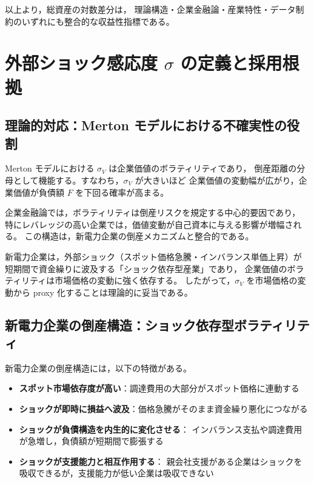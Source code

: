 以上より，総資産の対数差分は，
理論構造・企業金融論・産業特性・データ制約のいずれにも整合的な収益性指標である。


\section{外部ショック感応度 $\sigma$ の定義と採用根拠}

\subsection{理論的対応：Merton モデルにおける不確実性の役割}

Merton モデルにおける $\sigma_V$ は企業価値のボラティリティであり，
倒産距離の分母として機能する。すなわち，$\sigma_V$ が大きいほど
企業価値の変動幅が広がり，企業価値が負債額 $F$ を下回る確率が高まる。

企業金融論では，ボラティリティは倒産リスクを規定する中心的要因であり，
特にレバレッジの高い企業では，価値変動が自己資本に与える影響が増幅される。
この構造は，新電力企業の倒産メカニズムと整合的である。

新電力企業は，外部ショック（スポット価格急騰・インバランス単価上昇）が
短期間で資金繰りに波及する「ショック依存型産業」であり，
企業価値のボラティリティは市場価格の変動に強く依存する。
したがって，$\sigma_V$ を市場価格の変動から proxy 化することは理論的に妥当である。

\subsection{新電力企業の倒産構造：ショック依存型ボラティリティ}

新電力企業の倒産構造には，以下の特徴がある。

\begin{itemize}
    \item \textbf{スポット市場依存度が高い}：調達費用の大部分がスポット価格に連動する
    \item \textbf{ショックが即時に損益へ波及}：価格急騰がそのまま資金繰り悪化につながる
    \item \textbf{ショックが負債構造を内生的に変化させる}：
          インバランス支払や調達費用が急増し，負債額が短期間で膨張する
    \item \textbf{ショックが支援能力と相互作用する}：
          親会社支援がある企業はショックを吸収できるが，支援能力が低い企業は吸収できない
\end{itemize}

